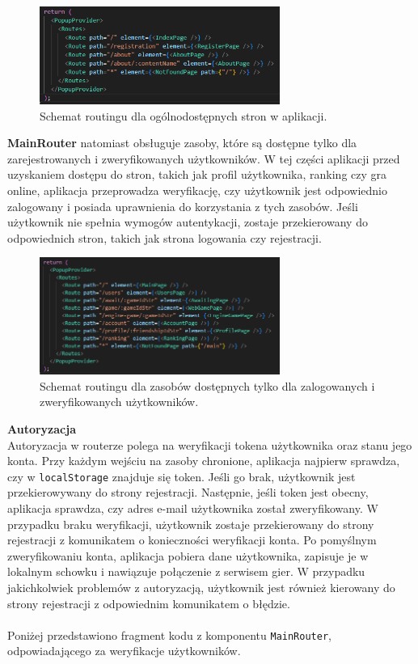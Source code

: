 \documentclass[12pt,a4paper]{article}
\begin{document}
\vspace{0.5cm}
\begin{figure}[h!]
    \centering
    \includegraphics[width=0.7\textwidth]{images/ex_index_router.png}
    \caption{Schemat routingu dla ogólnodostępnych stron w aplikacji.}
\end{figure}

\noindent
\textbf{MainRouter} natomiast obsługuje zasoby, które są dostępne tylko dla zarejestrowanych i zweryfikowanych użytkowników. W tej części aplikacji przed uzyskaniem dostępu do stron, takich jak profil użytkownika, ranking czy gra online, aplikacja przeprowadza weryfikację, czy użytkownik jest odpowiednio zalogowany i posiada uprawnienia do korzystania z tych zasobów. Jeśli użytkownik nie spełnia wymogów autentykacji, zostaje przekierowany do odpowiednich stron, takich jak strona logowania czy rejestracji.

\vspace{0.5cm}
\begin{figure}[h!]
    \centering
    \includegraphics[width=0.7\textwidth]{images/ex_main_router.png}
    \caption{Schemat routingu dla zasobów dostępnych tylko dla zalogowanych i zweryfikowanych użytkowników.}
\end{figure}

\newpage

\noindent \textbf{Autoryzacja}\\
Autoryzacja w routerze polega na weryfikacji tokena użytkownika oraz stanu jego konta. Przy każdym wejściu na zasoby chronione, aplikacja najpierw sprawdza, czy w \texttt{localStorage} znajduje się token. Jeśli go brak, użytkownik jest przekierowywany do strony rejestracji. Następnie, jeśli token jest obecny, aplikacja sprawdza, czy adres e-mail użytkownika został zweryfikowany. W przypadku braku weryfikacji, użytkownik zostaje przekierowany do strony rejestracji z komunikatem o konieczności weryfikacji konta. Po pomyślnym zweryfikowaniu konta, aplikacja pobiera dane użytkownika, zapisuje je w lokalnym schowku i nawiązuje połączenie z serwisem gier. W przypadku jakichkolwiek problemów z autoryzacją, użytkownik jest również kierowany do strony rejestracji z odpowiednim komunikatem o błędzie.
\\\\
Poniżej przedstawiono fragment kodu z komponentu \texttt{MainRouter}, odpowiadającego za weryfikacje użytkowników.
\end{document}
